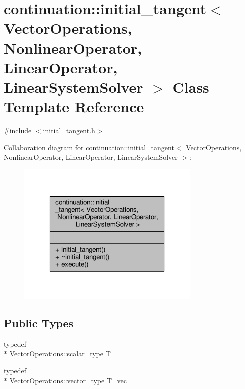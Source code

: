 \hypertarget{classcontinuation_1_1initial__tangent}{\section{continuation\-:\-:initial\-\_\-tangent$<$ Vector\-Operations, Nonlinear\-Operator, Linear\-Operator, Linear\-System\-Solver $>$ Class Template Reference}
\label{classcontinuation_1_1initial__tangent}
}


{\ttfamily \#include $<$initial\-\_\-tangent.\-h$>$}



Collaboration diagram for continuation\-:\-:initial\-\_\-tangent$<$ Vector\-Operations, Nonlinear\-Operator, Linear\-Operator, Linear\-System\-Solver $>$\-:
\nopagebreak
\begin{figure}[H]
\begin{center}
\leavevmode
\includegraphics[width=250pt]{classcontinuation_1_1initial__tangent__coll__graph}
\end{center}
\end{figure}
\subsection*{Public Types}
\begin{DoxyCompactItemize}
\item 
typedef \\*
Vector\-Operations\-::scalar\-\_\-type \hyperlink{classcontinuation_1_1initial__tangent_a39f8fc77c4f6d3de481cd8550bb3e768}{T}
\item 
typedef \\*
Vector\-Operations\-::vector\-\_\-type \hyperlink{classcontinuation_1_1initial__tangent_ad348e9e404ffd58ae936cfae5cddc928}{T\-\_\-vec}
\end{DoxyCompactItemize}
